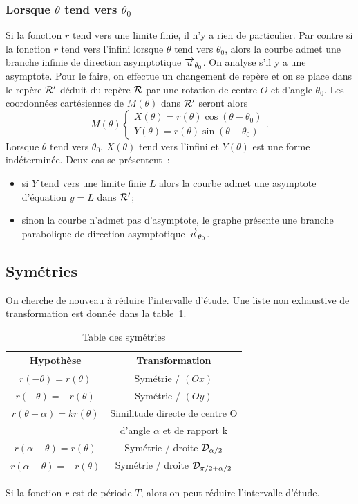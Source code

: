 \subsubsection{Lorsque \(\theta\) tend vers \(\theta_0\)}
Si la fonction \(r\) tend vers une limite finie, il n'y a rien de particulier. Par contre si la fonction \(r\) tend vers l'infini lorsque \(\theta\) tend vers \(\theta_0\), alors la courbe admet une branche infinie de direction asymptotique \(\overrightarrow{u}_{\theta_0}\). On analyse s'il y a une asymptote. Pour le faire, on effectue un changement de repère et on se place dans le repère \(\mathcal{R}'\) déduit du repère \(\mathcal{R}\) par une rotation de centre \(O\) et d'angle \(\theta_0\). Les coordonnées cartésiennes de \(M(\theta)\) dans \(\mathcal{R}'\) seront alors
\begin{equation}
  M(\theta)
  \begin{cases}
    X(\theta)=r(\theta)\cos(\theta-\theta_0)\\
    Y(\theta)=r(\theta)\sin(\theta-\theta_0)
  \end{cases}.
\end{equation}
Lorsque \(\theta\) tend vers \(\theta_0\), \(X(\theta)\) tend vers l'infini et \(Y(\theta)\) est une forme indéterminée. Deux cas se présentent~:
\begin{itemize}
\item si \(Y\) tend vers une limite finie \(L\) alors la courbe admet une asymptote d'équation \(y=L\) dans \(\mathcal{R}'\);
\item sinon la courbe n'admet pas d'asymptote, le graphe présente une branche parabolique de direction asymptotique \(\overrightarrow{u}_{\theta_0}\).
\end{itemize}

\subsection{Symétries}
On cherche de nouveau à réduire l'intervalle d'étude. Une liste non exhaustive de transformation est donnée dans la table~\ref{tab:sympol}.
\begin{table}
  \centering
  \begin{tabular}{|c|c|}\hline
    Hypothèse & Transformation \\ \hline
    \(r(-\theta)=r(\theta)\) & Symétrie / \((Ox)\) \\ \hline
    \(r(-\theta)=-r(\theta)\) & Symétrie / \((Oy)\) \\ \hline
    \(r(\theta+\alpha)=kr(\theta)\) & Similitude directe de centre O \\ & d'angle \(\alpha\) et de rapport k \\ \hline
    \(r(\alpha-\theta)=r(\theta)\) & Symétrie / droite \(\mathcal{D}_{\alpha/2}\) \\ \hline
    \(r(\alpha-\theta)=-r(\theta)\) & Symétrie / droite \(\mathcal{D}_{\pi/2 + \alpha/2}\) \\ \hline
 \end{tabular}
 \caption{Table des symétries}
 \label{tab:sympol}
\end{table}
Si la fonction \(r\) est de période \(T\), alors on peut réduire l'intervalle d'étude.
